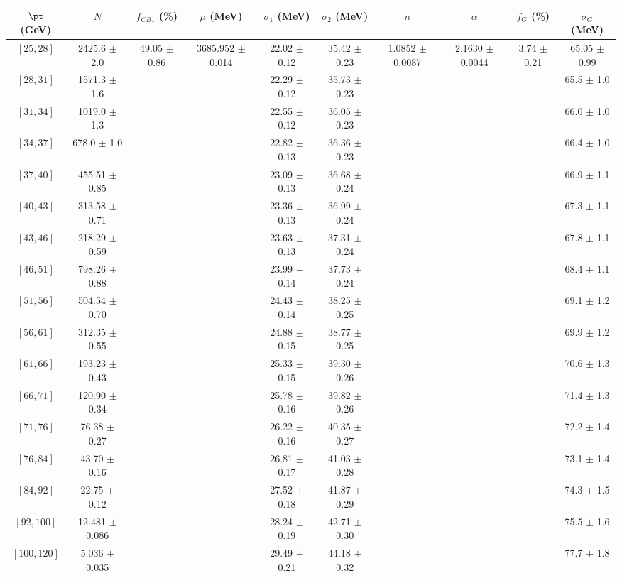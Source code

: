 \begin{tabular}{c||c|c|c|c|c|c|c|c|c}
$\pt$ (GeV) & $N$ & $f_{CB1}$ (\%)  & $\mu$ (MeV) & $\sigma_1$ (MeV) & $\sigma_2$ (MeV) & $n$ & $\alpha$ & $f_G$ (\%) & $\sigma_G$ (MeV) \\
\hline
$[25, 28]$ & 2425.6 $\pm$ 2.0 & \multirow{17}{*}{49.05 $\pm$ 0.86} & \multirow{17}{*}{3685.952 $\pm$ 0.014} & 22.02 $\pm$ 0.12 & 35.42 $\pm$ 0.23 & \multirow{17}{*}{1.0852 $\pm$ 0.0087} & \multirow{17}{*}{2.1630 $\pm$ 0.0044} & \multirow{17}{*}{3.74 $\pm$ 0.21} & 65.05 $\pm$ 0.99\\
$[28, 31]$ & 1571.3 $\pm$ 1.6 &  &  & 22.29 $\pm$ 0.12 & 35.73 $\pm$ 0.23 &  &  &  & 65.5 $\pm$ 1.0\\
$[31, 34]$ & 1019.0 $\pm$ 1.3 &  &  & 22.55 $\pm$ 0.12 & 36.05 $\pm$ 0.23 &  &  &  & 66.0 $\pm$ 1.0\\
$[34, 37]$ & 678.0 $\pm$ 1.0 &  &  & 22.82 $\pm$ 0.13 & 36.36 $\pm$ 0.23 &  &  &  & 66.4 $\pm$ 1.0\\
$[37, 40]$ & 455.51 $\pm$ 0.85 &  &  & 23.09 $\pm$ 0.13 & 36.68 $\pm$ 0.24 &  &  &  & 66.9 $\pm$ 1.1\\
$[40, 43]$ & 313.58 $\pm$ 0.71 &  &  & 23.36 $\pm$ 0.13 & 36.99 $\pm$ 0.24 &  &  &  & 67.3 $\pm$ 1.1\\
$[43, 46]$ & 218.29 $\pm$ 0.59 &  &  & 23.63 $\pm$ 0.13 & 37.31 $\pm$ 0.24 &  &  &  & 67.8 $\pm$ 1.1\\
$[46, 51]$ & 798.26 $\pm$ 0.88 &  &  & 23.99 $\pm$ 0.14 & 37.73 $\pm$ 0.24 &  &  &  & 68.4 $\pm$ 1.1\\
$[51, 56]$ & 504.54 $\pm$ 0.70 &  &  & 24.43 $\pm$ 0.14 & 38.25 $\pm$ 0.25 &  &  &  & 69.1 $\pm$ 1.2\\
$[56, 61]$ & 312.35 $\pm$ 0.55 &  &  & 24.88 $\pm$ 0.15 & 38.77 $\pm$ 0.25 &  &  &  & 69.9 $\pm$ 1.2\\
$[61, 66]$ & 193.23 $\pm$ 0.43 &  &  & 25.33 $\pm$ 0.15 & 39.30 $\pm$ 0.26 &  &  &  & 70.6 $\pm$ 1.3\\
$[66, 71]$ & 120.90 $\pm$ 0.34 &  &  & 25.78 $\pm$ 0.16 & 39.82 $\pm$ 0.26 &  &  &  & 71.4 $\pm$ 1.3\\
$[71, 76]$ & 76.38 $\pm$ 0.27 &  &  & 26.22 $\pm$ 0.16 & 40.35 $\pm$ 0.27 &  &  &  & 72.2 $\pm$ 1.4\\
$[76, 84]$ & 43.70 $\pm$ 0.16 &  &  & 26.81 $\pm$ 0.17 & 41.03 $\pm$ 0.28 &  &  &  & 73.1 $\pm$ 1.4\\
$[84, 92]$ & 22.75 $\pm$ 0.12 &  &  & 27.52 $\pm$ 0.18 & 41.87 $\pm$ 0.29 &  &  &  & 74.3 $\pm$ 1.5\\
$[92, 100]$ & 12.481 $\pm$ 0.086 &  &  & 28.24 $\pm$ 0.19 & 42.71 $\pm$ 0.30 &  &  &  & 75.5 $\pm$ 1.6\\
$[100, 120]$ & 5.036 $\pm$ 0.035 &  &  & 29.49 $\pm$ 0.21 & 44.18 $\pm$ 0.32 &  &  &  & 77.7 $\pm$ 1.8\\
\end{tabular}
